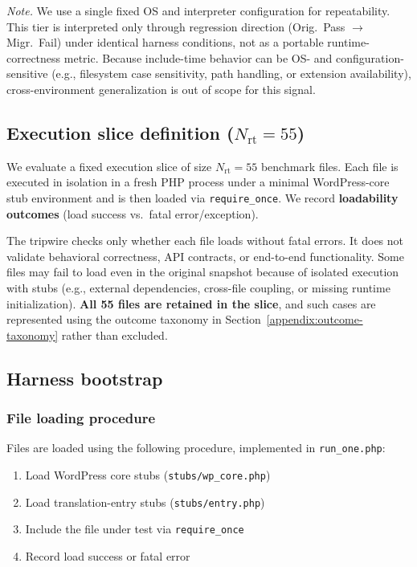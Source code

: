 \noindent\emph{Note.}
We use a single fixed OS and interpreter configuration for repeatability.
This tier is interpreted only through regression direction (Orig.\ Pass $\rightarrow$ Migr.\ Fail) under identical harness conditions, not as a portable runtime-correctness metric.
Because include-time behavior can be OS- and configuration-sensitive (e.g., filesystem case sensitivity, path handling, or extension availability), cross-environment generalization is out of scope for this signal.

\subsection{Execution slice definition ($N_{\mathrm{rt}}=55$)}
\label{appendix:runtime-slice-def}

We evaluate a fixed execution slice of size $N_{\mathrm{rt}}=55$ benchmark files.
Each file is executed in isolation in a fresh PHP process under a minimal WordPress-core stub environment and is then loaded via \texttt{require\_once}.
We record \textbf{loadability outcomes} (load success vs.\ fatal error/exception).

The tripwire checks only whether each file loads without fatal errors.
It does not validate behavioral correctness, API contracts, or end-to-end functionality.
Some files may fail to load even in the original snapshot because of isolated execution with stubs (e.g., external dependencies, cross-file coupling, or missing runtime initialization).
\textbf{All 55 files are retained in the slice}, and such cases are represented using the outcome taxonomy in Section~\ref{appendix:outcome-taxonomy} rather than excluded.

\subsection{Harness bootstrap}
\label{appendix:harness-bootstrap}

\subsubsection{File loading procedure}
Files are loaded using the following procedure, implemented in \texttt{run\_one.php}:

\begin{enumerate}
    \item Load WordPress core stubs (\texttt{stubs/wp\_core.php})
    \item Load translation-entry stubs (\texttt{stubs/entry.php})
    \item Include the file under test via \texttt{require\_once}
    \item Record load success or fatal error
\end{enumerate}

